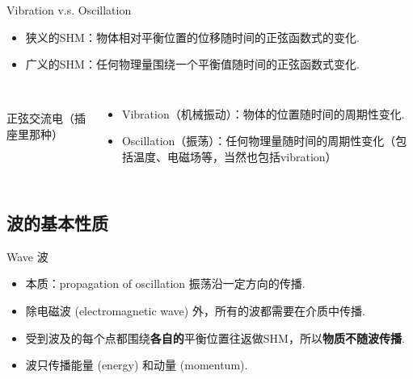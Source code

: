 \documentclass{beamer}
\begin{document}
\begin{frame}{Vibration v.s. Oscillation}
	\begin{itemize}
		\item 狭义的SHM：物体相对平衡位置的位移随时间的正弦函数式的变化.
		\item 广义的SHM：任何物理量围绕一个平衡值随时间的正弦函数式变化.
	\end{itemize}
	\begin{columns}
		\begin{center}
		\\
		正弦交流电（插座里那种）
		\end{center}
		\begin{itemize}
			\item Vibration（机械振动）：物体的位置随时间的周期性变化.
			\item Oscillation（振荡）：任何物理量随时间的周期性变化（包括温度、电磁场等，当然也包括vibration）
		\end{itemize}
	\end{columns}
\end{frame}

\subsection{波的基本性质}

\begin{frame}{Wave 波}
	\begin{itemize}
		\item 本质：propagation of oscillation 振荡沿一定方向的传播.
		\item 除电磁波 (electromagnetic wave) 外，所有的波都需要在介质中传播.
		\item 受到波及的每个点都围绕\textbf{各自的}平衡位置往返做SHM，所以\textbf{物质不随波传播}.
		\item 波只传播能量 (energy) 和动量 (momentum).
	\end{itemize}
\end{frame}
\end{document}
